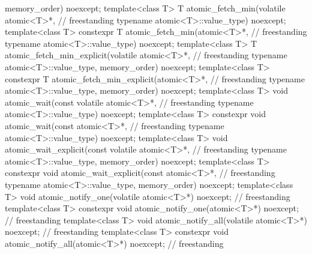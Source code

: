 \begin{codeblock}
{                                memory_order) noexcept;
  template<class T>
    T atomic_fetch_min(volatile atomic<T>*,                                         // freestanding
                       typename atomic<T>::value_type) noexcept;
  template<class T>
    constexpr T atomic_fetch_min(atomic<T>*,                                        // freestanding
                       typename atomic<T>::value_type) noexcept;
  template<class T>
    T atomic_fetch_min_explicit(volatile atomic<T>*,                                // freestanding
                                typename atomic<T>::value_type,
                                memory_order) noexcept;
  template<class T>
    constexpr T atomic_fetch_min_explicit(atomic<T>*,                               // freestanding
                                typename atomic<T>::value_type,
                                memory_order) noexcept;
  template<class T>
    void atomic_wait(const volatile atomic<T>*,                                     // freestanding
	             typename atomic<T>::value_type) noexcept;
  template<class T>
    constexpr void atomic_wait(const atomic<T>*,                                    // freestanding
                               typename atomic<T>::value_type) noexcept;
  template<class T>
    void atomic_wait_explicit(const volatile atomic<T>*,                            // freestanding
                              typename atomic<T>::value_type,
                              memory_order) noexcept;
  template<class T>
    constexpr void atomic_wait_explicit(const atomic<T>*,                           // freestanding
                                        typename atomic<T>::value_type,
                                        memory_order) noexcept;
  template<class T>
    void atomic_notify_one(volatile atomic<T>*) noexcept;                           // freestanding
  template<class T>
    constexpr void atomic_notify_one(atomic<T>*) noexcept;                          // freestanding
  template<class T>
    void atomic_notify_all(volatile atomic<T>*) noexcept;                           // freestanding
  template<class T>
    constexpr void atomic_notify_all(atomic<T>*) noexcept;                          // freestanding

}
\end{codeblock}
